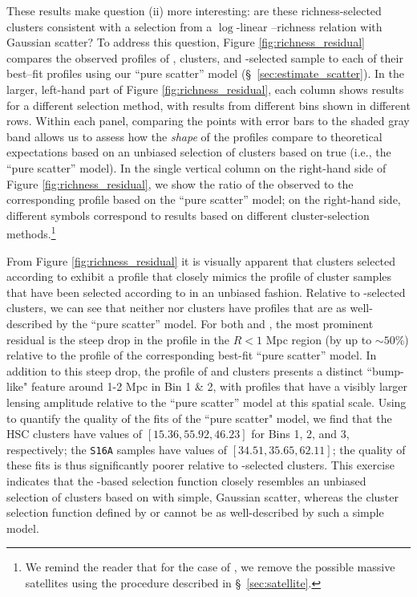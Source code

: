 \documentclass[fleqn,usenatbib,useAMS]{mnras}
\begin{document}
\begin{CJK*}{UTF8}{gbsn}
    These results make question (ii) more interesting: are these richness-selected clusters
    consistent with a selection from a $\log$-linear \mvir{}--richness relation with Gaussian
    scatter? 
    To address this question, Figure \ref{fig:richness_residual} compares the observed \dsigma{}
    profiles of \redm{}, \camira{} clusters, and -selected sample to each of their
    best--fit profiles using our ``pure scatter'' model (\S\ \ref{sec:estimate_scatter}). 
    In the larger, left-hand part of Figure \ref{fig:richness_residual}, each column shows results
    for a different \topn{} selection method, with results from different bins shown in different
    rows. 
    Within each panel, comparing the points with error bars to the shaded gray band allows us to 
    assess how the {\em shape} of the \dsigma{} profiles compare to theoretical expectations based
    on an unbiased selection of clusters based on true \mvir{} (i.e., the ``pure scatter'' model).
    In the single vertical column on the right-hand side of Figure \ref{fig:richness_residual}, we
    show the ratio of the observed \dsigma{} to the corresponding profile based on the ``pure
    scatter'' model; on the right-hand side, different symbols correspond to results based on
    different cluster-selection methods.\footnote{We remind the reader that for the case of
    , we remove the possible massive satellites using the procedure described in \S\
    \ref{sec:satellite}.}    

    From Figure \ref{fig:richness_residual} it is visually apparent that clusters selected according
    to \menve{50}{100} exhibit a \dsigma{} profile that closely mimics the profile of cluster
    samples that have been selected according to \mvir{} in an unbiased fashion. 
    Relative to \menve{50}{100}-selected clusters, we can see that neither \redm{} nor \camira{}
    clusters have \dsigma{} profiles that are as well-described by the ``pure scatter'' model.
    For both \redm{} and \camira{}, the most prominent residual  is the steep drop in the profile in
    the $R < 1$ Mpc region (by up to $\sim 50$\%) relative to the profile of the corresponding
    best-fit ``pure scatter'' model. 
    In addition to this steep drop, the \dsigma{} profile of \redm{} and \camira{} clusters presents
    a distinct ``bump-like" feature around 1-2 Mpc in Bin 1 \& 2, with profiles that have a visibly
    larger lensing amplitude relative to the ``pure scatter'' model at this spatial scale.  
    Using \chisq{} to quantify the quality of the fits of the ``pure scatter" model, we find that
    the HSC \redm{} clusters have values of $[15.36, 55.92, 46.23]$ for Bins 1, 2, and 3,
    respectively; the \camira{} \texttt{S16A} samples have values of $[34.51, 35.65, 62.11]$; the
    quality of these fits is thus significantly poorer relative to \menve{50}{100}-selected
    clusters. 
    This exercise indicates that the -based selection function closely resembles an
    unbiased selection of clusters based on \mvir{} with simple, Gaussian scatter, whereas the
    cluster selection function defined by \redm{} or \camira{} cannot be as well-described by such a
    simple model.
    

\end{CJK*}
\end{document}
